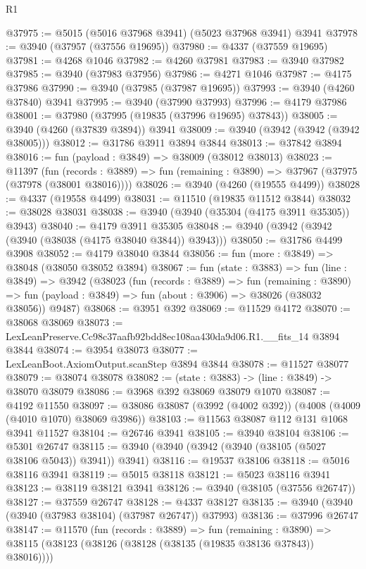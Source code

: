 \begin{lexlean}{R1}
\begin{coremodule}
@37975 := @5015 (@5016 @37968 @3941) (@5023 @37968 @3941) @3941
@37978 := @3940 (@37957 (@37556 @19695))
@37980 := @4337 (@37559 @19695)
@37981 := @4268 @1046
@37982 := @4260 @37981
@37983 := @3940 @37982
@37985 := @3940 (@37983 @37956)
@37986 := @4271 @1046
@37987 := @4175 @37986
@37990 := @3940 (@37985 (@37987 @19695))
@37993 := @3940 (@4260 @37840) @3941
@37995 := @3940 (@37990 @37993)
@37996 := @4179 @37986
@38001 := @37980 (@37995 (@19835 (@37996 @19695) @37843))
@38005 := @3940 (@4260 (@37839 @3894)) @3941
@38009 := @3940 (@3942 (@3942 (@3942 @38005)))
@38012 := @31786 @3911 @3894 @3844
@38013 := @37842 @3894
@38016 := fun (payload : @3849) => @38009 (@38012 @38013)
@38023 := @11397
    (fun (records : @3889) => fun (remaining : @3890) => @37967 (@37975 (@37978 (@38001 @38016))))
@38026 := @3940 (@4260 (@19555 @4499))
@38028 := @4337 (@19558 @4499)
@38031 := @11510 (@19835 @11512 @3844)
@38032 := @38028 @38031
@38038 := @3940 (@3940 (@35304 (@4175 @3911 @35305)) @3943)
@38040 := @4179 @3911 @35305
@38048 := @3940 (@3942 (@3942 (@3940 (@38038 (@4175 @38040 @3844)) @3943)))
@38050 := @31786 @4499 @3908
@38052 := @4179 @38040 @3844
@38056 := fun (more : @3849) => @38048 (@38050 @38052 @3894)
@38067 := fun (state : @3883) =>
  fun (line : @3849) =>
  @3942
    (@38023
      (fun (records : @3889) =>
      fun (remaining : @3890) =>
      fun (payload : @3849) => fun (about : @3906) => @38026 (@38032 @38056))
      @9487)
@38068 := @3951 @392
@38069 := @11529 @4172
@38070 := @38068 @38069
@38073 := LexLeanPreserve.Cc98c37aafb92bdd8ec108aa430da9d06.R1.__fits_14 @3894 @3844
@38074 := @3954 @38073
@38077 := LexLeanBoot.AxiomOutput.scanStep @3894 @3844
@38078 := @11527 @38077
@38079 := @38074 @38078
@38082 := (state : @3883) -> (line : @3849) -> @38070 @38079
@38086 := @3968 @392 @38069 @38079 @1070
@38087 := @4192 @11550
@38097 := @38086 @38087 (@3992 (@4002 @392)) (@4008 (@4009 (@4010 @1070) @38069 @3986))
@38103 := @11563 @38087 @112 @131 @1068 @3941 @11527
@38104 := @26746 @3941
@38105 := @3940 @38104
@38106 := @5301 @26747
@38115 := @3940 (@3940 (@3942 (@3940 (@38105 (@5027 @38106 @5043)) @3941)) @3941)
@38116 := @19537 @38106
@38118 := @5016 @38116 @3941
@38119 := @5015 @38118
@38121 := @5023 @38116 @3941
@38123 := @38119 @38121 @3941
@38126 := @3940 (@38105 (@37556 @26747))
@38127 := @37559 @26747
@38128 := @4337 @38127
@38135 := @3940 (@3940 (@3940 (@37983 @38104) (@37987 @26747)) @37993)
@38136 := @37996 @26747
@38147 := @11570
    (fun (records : @3889) =>
    fun (remaining : @3890) =>
    @38115 (@38123 (@38126 (@38128 (@38135 (@19835 @38136 @37843)) @38016))))

\end{coremodule}
\end{lexlean}
